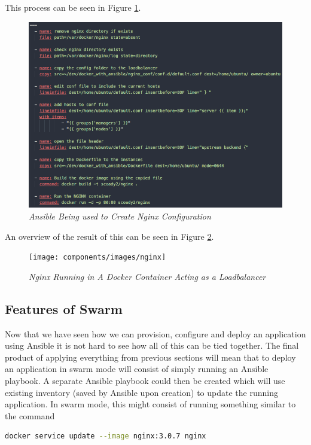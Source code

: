 \documentclass{article}
\begin{document}
This process can be seen in Figure \ref{fig:nginx_conf}.

\begin{figure}[!h]
\centering
\includegraphics*[width=\textwidth]{components/images/nginx_conf}
\caption{\em Ansible Being used to Create Nginx Configuration}
\label{fig:nginx_conf}
\end{figure}

An overview of the result of this can be seen in Figure \ref{fig:nginx}.

\begin{figure}[!h]
\centering
\texttt{[image: components/images/nginx]}
\caption{\em Nginx Running in A Docker Container Acting as a Loadbalancer}
\label{fig:nginx}
\end{figure}

\newpage
\subsection{Features of Swarm}
\label{sub:swarm_features}
Now that we have seen how we can provision, configure and deploy an application using Ansible it is not hard to see how all of this can be tied together. The final product of applying everything from previous sections will mean that to deploy an application in swarm mode will consist of simply running an Ansible playbook. A separate Ansible playbook could then be created which will use existing inventory (saved by Ansible upon creation) to update the running application. In swarm mode, this might consist of running something similar to the command

\begin{lstlisting}[language=bash]
  docker service update --image nginx:3.0.7 nginx
\end{lstlisting}
\end{document}
